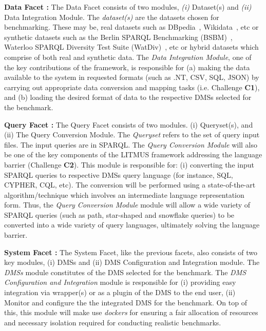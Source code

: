 \documentclass{llncs}
\begin{document}
\begin{itemize}[nosep]
        \textbf{Data Facet :} The Data Facet consists of two modules, \textit{(i)} Dataset(s) and \textit{(ii)} Data Integration Module. The \textit{dataset(s)} are the datasets chosen for benchmarking. These may be, real datasets such as DBpedia~\cite{auer2007dbpedia}, Wikidata~\cite{vrandevcic2014wikidata}, etc or synthetic datasets such as the Berlin SPARQL Benchmarking (BSBM)~\cite{bizer2008benchmarking,bizer2009berlin}, Waterloo SPARQL Diversity Test Suite (WatDiv)~\cite{alucc2014diversified}, etc or hybrid datasets which comprise of both real and synthetic data. 
        The \textit{Data Integration Module}, one of the key contributions of the framework, is responsible for (a) making the data available to the system in requested formats (such as .NT, CSV, SQL, JSON) by carrying out appropriate data conversion and mapping tasks (i.e. Challenge \textbf{C1}), and (b) loading the desired format of data to the respective DMSs selected for the benchmark. 
        
        \textbf{Query Facet :} The Query Facet consists of two modules. (i) Queryset(s), and (ii) The Query Conversion Module. The \textit{Queryset} refers to the set of query input files. The input queries are in SPARQL. The \textit{Query Conversion Module} will also be one of the key components of the LITMUS framework addressing the language barrier (Challenge \textbf{C2}). This module is responsible for: (i) converting the input SPARQL queries to respective DMSs query language (for instance, SQL, CYPHER, CQL, etc). The conversion will be performed using a state-of-the-art algorithm/technique which involves an intermediate language representation form. Thus, the \textit{Query Conversion Module} module will allow a wide variety of SPARQL queries (such as path, star-shaped and snowflake queries) to be converted into a wide variety of query languages, ultimately solving the language barrier.
        
        \textbf{System Facet :} The System Facet, like the previous facets, also consists of two key modules, (i) DMSs and (ii) DMS Configuration and Integration module. The \textit{DMSs} module  constitutes of the DMS selected for the benchmark. The \textit{DMS Configuration and Integration} module is responsible for (i) providing easy integration via wrapper(s) or as a plugin of the DMS to the end user, (ii) Monitor and configure the the integrated DMS for the benchmark. On top of this, this module will make use \textit{dockers} for ensuring a fair allocation of resources and necessary isolation required for conducting realistic benchmarks. 
        

\end{itemize}
\end{document}
